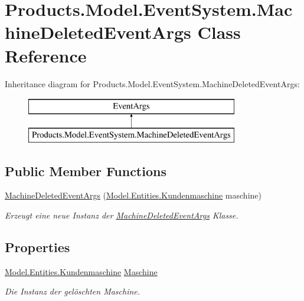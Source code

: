 \hypertarget{class_products_1_1_model_1_1_event_system_1_1_machine_deleted_event_args}{}\section{Products.\+Model.\+Event\+System.\+Machine\+Deleted\+Event\+Args Class Reference}
\label{class_products_1_1_model_1_1_event_system_1_1_machine_deleted_event_args}
Inheritance diagram for Products.\+Model.\+Event\+System.\+Machine\+Deleted\+Event\+Args\+:\begin{figure}[H]
\begin{center}
\leavevmode
\includegraphics[height=2.000000cm]{class_products_1_1_model_1_1_event_system_1_1_machine_deleted_event_args}
\end{center}
\end{figure}
\subsection*{Public Member Functions}
\begin{DoxyCompactItemize}
\item 
\hyperlink{class_products_1_1_model_1_1_event_system_1_1_machine_deleted_event_args_ab198c5861ef87954b4a24bf5dce45258}{Machine\+Deleted\+Event\+Args} (\hyperlink{class_products_1_1_model_1_1_entities_1_1_kundenmaschine}{Model.\+Entities.\+Kundenmaschine} maschine)
\begin{DoxyCompactList}\small\item\em Erzeugt eine neue Instanz der \hyperlink{class_products_1_1_model_1_1_event_system_1_1_machine_deleted_event_args}{Machine\+Deleted\+Event\+Args} Klasse. \end{DoxyCompactList}\end{DoxyCompactItemize}
\subsection*{Properties}
\begin{DoxyCompactItemize}
\item 
\hyperlink{class_products_1_1_model_1_1_entities_1_1_kundenmaschine}{Model.\+Entities.\+Kundenmaschine} \hyperlink{class_products_1_1_model_1_1_event_system_1_1_machine_deleted_event_args_a7778078231013f5e82e66134d7694674}{Maschine}
\begin{DoxyCompactList}\small\item\em Die Instanz der gelöschten Maschine. \end{DoxyCompactList}\end{DoxyCompactItemize}


